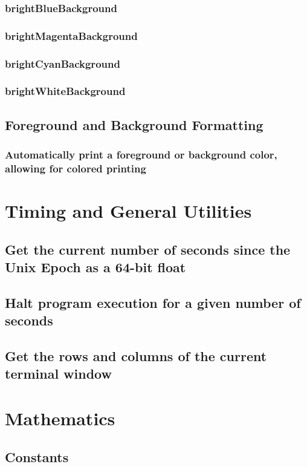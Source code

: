 \documentclass[10pt,a4paper]{report}
\begin{document}
			\subsubsection{brightBlueBackground}
			\subsubsection{brightMagentaBackground}
			\subsubsection{brightCyanBackground}
			\subsubsection{brightWhiteBackground}
		\subsection{Foreground and Background Formatting}
			\subsubsection{Automatically print a foreground or background color, allowing for colored printing}

	\pagebreak

	\section{Timing and General Utilities}
		\subsection{Get the current number of seconds since the Unix Epoch as a 64-bit float}
		\subsection{Halt program execution for a given number of seconds}
		\subsection{Get the rows and columns of the current terminal window}

	\pagebreak

	\section{Mathematics}
		\subsection{Constants}
\end{document}
